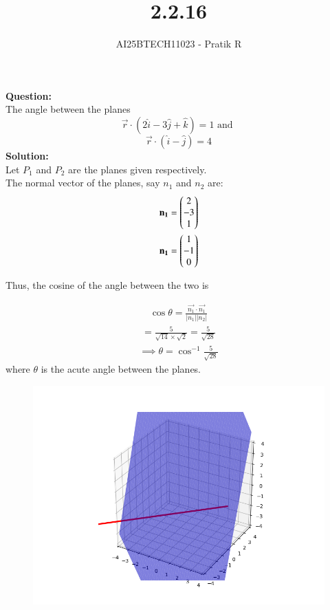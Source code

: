 \documentclass[journal]{IEEEtran}
\begin{document}

\vspace{3cm}

\title{2.2.16}
\author{AI25BTECH11023 - Pratik R}
{\let\newpage\relax\maketitle}

\renewcommand{\thefigure}{\theenumi}
\renewcommand{\thetable}{\theenumi}
\setlength{\intextsep}{10pt} 


\renewcommand{\thetable}{\theenumi}

\textbf{Question: }\\
The angle between the planes
$$
\vec{r} \cdot (2\hat{i}-3\hat{j}+\hat{k})=1 \text{ and } 
$$
$$
\vec{r} \cdot(\hat{i}-\hat{j})=4
$$
\textbf{Solution: } \\
Let $P_1$ and $P_2$ are the planes given respectively. \\
The normal vector of the planes, say $n_1$ and $n_2$ are:
\begin{align}
    \mathbf{n_1}= \begin{pmatrix}2 \\ -3 \\ 1\end{pmatrix} \\
    \mathbf{n_1}= \begin{pmatrix}1 \\ -1 \\ 0\end{pmatrix}
\end{align}

Thus, the cosine of the angle between the two is


\begin{align}
   \cos \theta = \frac{\vec{n_1} \cdot \vec{n_1}}{|n_1||n_2|}  
\end{align}
\begin{align}
    = \frac{5}{\sqrt{14}\times\sqrt{2}} = \frac{5}{\sqrt{28}}
\end{align}
\begin{align}
    \implies \theta = \cos ^{-1}\frac{5}{\sqrt{28}}
\end{align}
where $\theta$ is the acute angle between the planes.

\begin{figure}[H]
    \centering
    \includegraphics[width=0.7\columnwidth]{figs/fig.png}
    \caption*{}
\end{figure}
\end{document}

